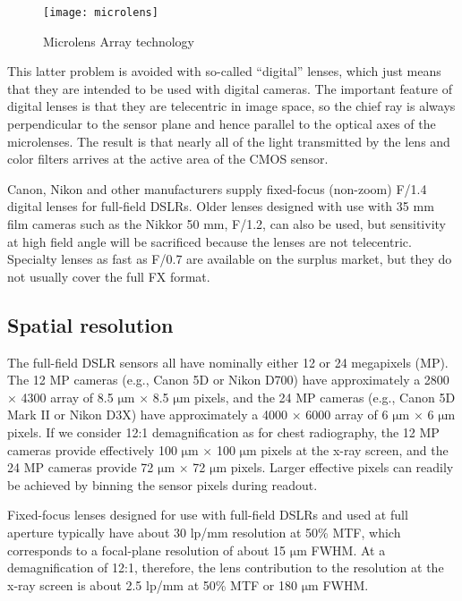 \begin{figure}[h]
\centering
\texttt{[image: microlens]}
\caption{Microlens Array technology}
\label{fig:microlensarray}
\end{figure}

This latter problem is avoided with so-called ``digital'' lenses, which just means that they are intended to be used with digital cameras. The important feature of digital lenses is that they are telecentric in image space, so the chief ray is always perpendicular to the sensor plane and hence parallel to the optical axes of the microlenses. The result is that nearly all of the light transmitted by the lens and color filters arrives at the active area of the CMOS sensor. 

Canon, Nikon and other manufacturers supply fixed-focus (non-zoom) F/1.4 digital lenses for full-field DSLRs. Older lenses designed with use with 35 mm film cameras such as the Nikkor 50 mm, F/1.2, can also be used, but sensitivity at high field angle will be sacrificed because the lenses are not telecentric. Specialty lenses as fast as F/0.7 are available on the surplus market, but they do not usually cover the full FX format.

\subsection{Spatial resolution}
\label{subsect:spatial_resolution}
The full-field DSLR sensors all have nominally either 12 or 24 megapixels (MP). The 12 MP cameras (e.g., Canon 5D or Nikon D700) have approximately a 2800 $\times$ 4300 array of 8.5 $\mathrm{\mu m}$ $\times$ 8.5 $\mathrm{\mu m}$ pixels, and the 24 MP cameras (e.g., Canon 5D Mark II or Nikon D3X) have approximately a 4000 $\times$ 6000 array of 6 $\mathrm{\mu m}$ $\times$ 6 $\mathrm{\mu m}$ pixels. If we consider 12:1 demagnification as for chest radiography, the 12 MP cameras provide effectively 100 $\mathrm{\mu m}$ $\times$ 100 $\mathrm{\mu m}$ pixels at the x-ray screen, and the 24 MP cameras provide 72 $\mathrm{\mu m}$ $\times$ 72 $\mathrm{\mu m}$ pixels. Larger effective pixels can readily be achieved by binning the sensor pixels during readout.

Fixed-focus lenses designed for use with full-field DSLRs and used at full aperture typically have about 30 lp/mm resolution at 50\% MTF, which corresponds to a focal-plane resolution of about 15 $\mathrm{\mu m}$ FWHM. At a demagnification of 12:1, therefore, the lens contribution to the resolution at the x-ray screen is about 2.5 lp/mm at 50\% MTF or 180 $\mathrm{\mu m}$ FWHM.

